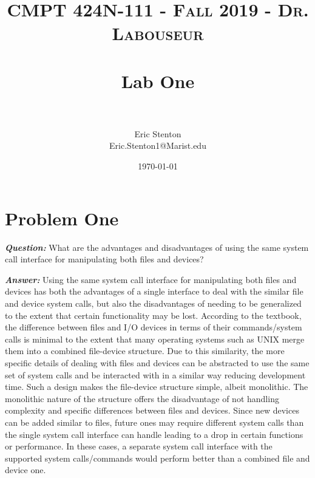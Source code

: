 \documentclass[letterpaper, 10pt,DIV=13]{scrartcl}
\title{	
   \normalfont \normalsize 
   \textsc{CMPT 424N-111 - Fall 2019 - Dr. Labouseur} \\[10pt] %
   \horrule{0.5pt} \\[0.25cm] 	%
   \huge Lab One  \\     	    %
   \horrule{0.5pt} \\[0.25cm] 	%
}
\author{Eric Stenton \\ \normalsize Eric.Stenton1@Marist.edu}
\date{\normalsize\today} 	%
\numberwithin{equation}{section} %
\numberwithin{figure}{section} %
\numberwithin{table}{section} %
\begin{document}
\maketitle %

\section{Problem One}

\textbf{\emph{Question:}}
What are the advantages and disadvantages of using the same system call interface for manipulating both files and devices?

\textbf{\emph{Answer:}}
Using the same system call interface for manipulating both files and devices has both the advantages of a single interface to deal with the similar file and device system calls, but also the disadvantages of needing to be generalized to the extent that certain functionality may be lost. According to the textbook, the difference between files and I/O devices in terms of their commands/system calls is minimal to the extent that many operating systems such as UNIX merge them into a combined file-device structure\cite{concepts}. Due to this similarity, the more specific details of dealing with files and devices can be abstracted to use the same set of system calls and be interacted with in a similar way reducing development time. Such a design makes the file-device structure simple, albeit monolithic. The monolithic nature of the structure offers the disadvantage of not handling complexity and specific differences between files and devices. Since new devices can be added similar to files, future ones may require different system calls than the single system call interface can handle leading to a drop in certain functions or performance. In these cases, a separate system call interface with the supported system calls/commands would perform better than a combined file and device one.


\pagebreak

\end{document}
